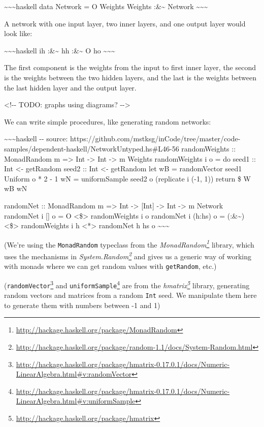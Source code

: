 \documentclass[]{article}
\renewcommand{\href}[2]{#2\footnote{\url{#1}}}
\begin{document}
\textasciitilde{}\textasciitilde{}\textasciitilde{}haskell data Network = O
Weights \textbar{} Weights :\&\textasciitilde{} Network
\textasciitilde{}\textasciitilde{}\textasciitilde{}

A network with one input layer, two inner layers, and one output layer would
look like:

\textasciitilde{}\textasciitilde{}\textasciitilde{}haskell ih
:\&\textasciitilde{} hh :\&\textasciitilde{} O ho
\textasciitilde{}\textasciitilde{}\textasciitilde{}

The first component is the weights from the input to first inner layer, the
second is the weights between the two hidden layers, and the last is the weights
between the last hidden layer and the output layer.

\textless{}!-\/- TODO: graphs using diagrams? -\/-\textgreater{}

We can write simple procedures, like generating random networks:

\textasciitilde{}\textasciitilde{}\textasciitilde{}haskell -\/- source:
https://github.com/mstksg/inCode/tree/master/code-samples/dependent-haskell/NetworkUntyped.hs\#L46-56
randomWeights :: MonadRandom m =\textgreater{} Int -\textgreater{} Int
-\textgreater{} m Weights randomWeights i o = do seed1 :: Int \textless{}-
getRandom seed2 :: Int \textless{}- getRandom let wB = randomVector seed1
Uniform o * 2 - 1 wN = uniformSample seed2 o (replicate i (-1, 1)) return \$ W
wB wN

randomNet :: MonadRandom m =\textgreater{} Int -\textgreater{} {[}Int{]}
-\textgreater{} Int -\textgreater{} m Network randomNet i {[}{]} o = O
\textless{}\$\textgreater{} randomWeights i o randomNet i (h:hs) o =
(:\&\textasciitilde{}) \textless{}\$\textgreater{} randomWeights i h
\textless{}*\textgreater{} randomNet h hs o
\textasciitilde{}\textasciitilde{}\textasciitilde{}

(We're using the \texttt{MonadRandom} typeclass from the
\emph{\href{http://hackage.haskell.org/package/MonadRandom}{MonadRandom}}
library, which uses the mechanisms in
\emph{\href{http://hackage.haskell.org/package/random-1.1/docs/System-Random.html}{System.Random}}
and gives us a generic way of working with monads where we can get random values
with \texttt{getRandom}, etc.)

(\href{http://hackage.haskell.org/package/hmatrix-0.17.0.1/docs/Numeric-LinearAlgebra.html\#v:randomVector}{\texttt{randomVector}}
and
\href{http://hackage.haskell.org/package/hmatrix-0.17.0.1/docs/Numeric-LinearAlgebra.html\#v:uniformSample}{\texttt{uniformSample}}
are from the \emph{\href{http://hackage.haskell.org/package/hmatrix}{hmatrix}}
library, generating random vectors and matrices from a random \texttt{Int} seed.
We manipulate them here to generate them with numbers between -1 and 1)
\end{document}
